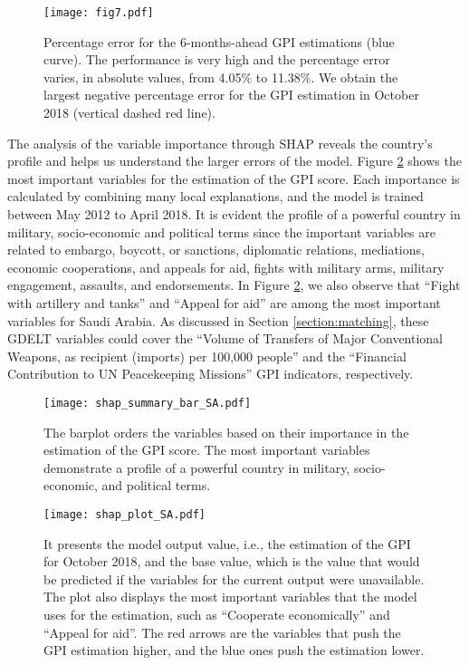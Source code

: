\documentclass{bmcart}
\begin{document}
\begin{figure}[h!]
\centering
\texttt{[image: fig7.pdf]}
  \caption{
      Percentage error for the 6-months-ahead GPI estimations (blue curve). 
      The performance is very high and the percentage error varies, in absolute values, from 4.05\% to 11.38\%. 
      We obtain the largest negative percentage error for the GPI estimation in October 2018 (vertical dashed red line).}
\label{fig:perc_error_SA}
\end{figure}


The analysis of the variable importance through SHAP reveals the country's profile and helps us understand the larger errors of the model.
Figure \ref{fig:global_var_SA} shows the most important variables for the estimation of the GPI score. 
Each importance is calculated by combining many local explanations, and the model is trained between May 2012 to April 2018. 
It is evident the profile of a powerful country in military, socio-economic and political terms since the important variables are related to embargo, boycott, or sanctions, diplomatic relations, mediations, economic cooperations, and appeals for aid, fights with military arms, military engagement, assaults, and endorsements. 
In Figure \ref{fig:global_var_SA}, we also observe that ``Fight with artillery and tanks'' and ``Appeal for aid'' are among the most important variables for Saudi Arabia.
As discussed in Section \ref{section:matching}, these GDELT variables could cover the ``Volume of Transfers of Major Conventional Weapons, as recipient (imports) per 100,000 people'' and the ``Financial Contribution to UN Peacekeeping Missions'' GPI indicators, respectively.

\begin{figure}[h!]
\centering
\texttt{[image: shap\_summary\_bar\_SA.pdf]}
  \caption{
      The barplot orders the variables based on their importance in the estimation of the GPI score. 
      The most important variables demonstrate a profile of a powerful country in military, socio-economic, and political terms.}
\label{fig:global_var_SA}
\end{figure}

\begin{figure}[h!]
\centering
\texttt{[image: shap\_plot\_SA.pdf]}
  \caption{
      It presents the model output value, i.e., the estimation of the GPI for October 2018, and the base value, which is the value that would be predicted if the variables for the current output were unavailable. 
      The plot also displays the most important variables that the model uses for the estimation, such as ``Cooperate economically'' and ``Appeal for aid''. 
      The red arrows are the variables that push the GPI estimation higher, and the blue ones push the estimation lower.}
\label{fig:shap_plot_SA}
\end{figure}
\end{document}
